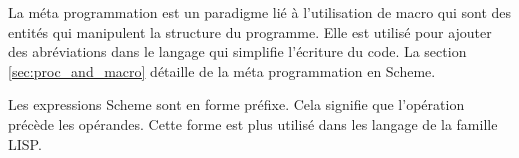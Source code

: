 La méta programmation est un paradigme lié à l'utilisation de macro qui sont
des entités qui manipulent la structure du programme. Elle est utilisé pour
ajouter des abréviations dans le langage qui simplifie l'écriture du code.  La
section \ref{sec:proc_and_macro} détaille de la méta programmation en Scheme.

Les expressions Scheme sont en forme préfixe. Cela signifie que l'opération
précède les opérandes. Cette forme est plus utilisé dans les langage de la famille
LISP.





